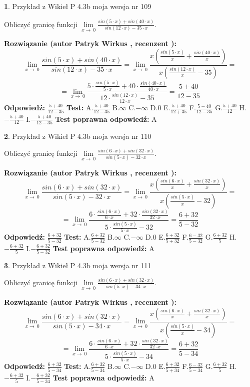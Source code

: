 \documentclass[12pt, a4paper]{article}
\theoremstyle{definition} %
\newtheorem{zad}{}
\newcommand{\zadStart}[1]{\begin{zad}#1\newline}
\newcommand{\zadStop}{\end{zad}}
\newcommand{\rozwStart}[2]{\noindent \textbf{Rozwiązanie (autor #1 , recenzent #2): }\newline}
\newcommand{\rozwStop}{\newline}
\newcommand{\odpStart}{\noindent \textbf{Odpowiedź:}\newline}
\newcommand{\odpStop}{\newline}
\newcommand{\testStart}{\noindent \textbf{Test:}\newline}
\newcommand{\testStop}{\newline}
\newcommand{\kluczStart}{\noindent \textbf{Test poprawna odpowiedź:}\newline}
\newcommand{\kluczStop}{\newline}
\begin{document}
\zadStart{Przykład z Wikieł P 4.3b moja wersja nr 109}


Obliczyć granicę funkcji $\lim\limits_{x\to\ 0}\frac{sin(5 \cdot x)+sin(40 \cdot x)}{sin(12 \cdot x)-35 \cdot x}$.
\zadStop
\rozwStart{Patryk Wirkus}{}
$$\lim\limits_{x\to\ 0}\frac{sin(5 \cdot x)+sin(40 \cdot x)}{sin(12 \cdot x)-35 \cdot x}=\lim\limits_{x\to\ 0}\frac{x(\frac{sin(5 \cdot x)}{x}+\frac{sin(40 \cdot x)}{x})}{x(\frac{sin(12 \cdot x)}{x}-35)}=$$
$$=\lim\limits_{x\to\ 0}\frac{5 \cdot \frac{sin(5 \cdot x)}{5 \cdot x}+40 \cdot \frac{sin(40 \cdot x)}{40 \cdot x}}{12 \cdot \frac{sin(12 \cdot x)}{12 \cdot x}-35}=\frac{5+40}{12-35}$$
\rozwStop
\odpStart
$\frac{5+40}{12-35}$
\odpStop
\testStart
A.$\frac{5+40}{12-35}$
B.$\infty$
C.$-\infty$
D.$0$
E.$\frac{5+40}{12+35}$
F.$\frac{5-40}{12-35}$
G.$\frac{5+40}{12}$
H.$-\frac{5+40}{12}$
I.$-\frac{5+40}{12-35}$
\testStop
\kluczStart
A
\kluczStop



\zadStart{Przykład z Wikieł P 4.3b moja wersja nr 110}


Obliczyć granicę funkcji $\lim\limits_{x\to\ 0}\frac{sin(6 \cdot x)+sin(32 \cdot x)}{sin(5 \cdot x)-32 \cdot x}$.
\zadStop
\rozwStart{Patryk Wirkus}{}
$$\lim\limits_{x\to\ 0}\frac{sin(6 \cdot x)+sin(32 \cdot x)}{sin(5 \cdot x)-32 \cdot x}=\lim\limits_{x\to\ 0}\frac{x(\frac{sin(6 \cdot x)}{x}+\frac{sin(32 \cdot x)}{x})}{x(\frac{sin(5 \cdot x)}{x}-32)}=$$
$$=\lim\limits_{x\to\ 0}\frac{6 \cdot \frac{sin(6 \cdot x)}{6 \cdot x}+32 \cdot \frac{sin(32 \cdot x)}{32 \cdot x}}{5 \cdot \frac{sin(5 \cdot x)}{5 \cdot x}-32}=\frac{6+32}{5-32}$$
\rozwStop
\odpStart
$\frac{6+32}{5-32}$
\odpStop
\testStart
A.$\frac{6+32}{5-32}$
B.$\infty$
C.$-\infty$
D.$0$
E.$\frac{6+32}{5+32}$
F.$\frac{6-32}{5-32}$
G.$\frac{6+32}{5}$
H.$-\frac{6+32}{5}$
I.$-\frac{6+32}{5-32}$
\testStop
\kluczStart
A
\kluczStop



\zadStart{Przykład z Wikieł P 4.3b moja wersja nr 111}


Obliczyć granicę funkcji $\lim\limits_{x\to\ 0}\frac{sin(6 \cdot x)+sin(32 \cdot x)}{sin(5 \cdot x)-34 \cdot x}$.
\zadStop
\rozwStart{Patryk Wirkus}{}
$$\lim\limits_{x\to\ 0}\frac{sin(6 \cdot x)+sin(32 \cdot x)}{sin(5 \cdot x)-34 \cdot x}=\lim\limits_{x\to\ 0}\frac{x(\frac{sin(6 \cdot x)}{x}+\frac{sin(32 \cdot x)}{x})}{x(\frac{sin(5 \cdot x)}{x}-34)}=$$
$$=\lim\limits_{x\to\ 0}\frac{6 \cdot \frac{sin(6 \cdot x)}{6 \cdot x}+32 \cdot \frac{sin(32 \cdot x)}{32 \cdot x}}{5 \cdot \frac{sin(5 \cdot x)}{5 \cdot x}-34}=\frac{6+32}{5-34}$$
\rozwStop
\odpStart
$\frac{6+32}{5-34}$
\odpStop
\testStart
A.$\frac{6+32}{5-34}$
B.$\infty$
C.$-\infty$
D.$0$
E.$\frac{6+32}{5+34}$
F.$\frac{6-32}{5-34}$
G.$\frac{6+32}{5}$
H.$-\frac{6+32}{5}$
I.$-\frac{6+32}{5-34}$
\testStop
\kluczStart
A
\kluczStop
\end{document}
